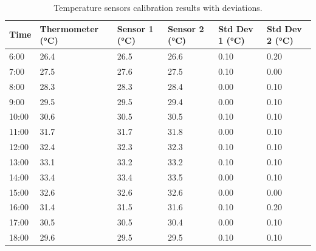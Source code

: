 \begin{table}[ht]
    \caption{Temperature sensors calibration results with deviations.}
    \label{tab:temperature-sensors-calibration}
    \hskip-1.2cm\begin{tabular}{@{}llllll@{}}
    \toprule
    \textbf{Time} & \textbf{Thermometer (°C)} & \textbf{Sensor 1 (°C)} & \textbf{Sensor 2 (°C)} & \textbf{Std Dev 1 (°C)} & \textbf{Std Dev 2 (°C)} \\ \midrule
    6:00          & 26.4                      & 26.5                   & 26.6                   & 0.10                    & 0.20                    \\
    7:00          & 27.5                      & 27.6                   & 27.5                   & 0.10                    & 0.00                    \\
    8:00          & 28.3                      & 28.3                   & 28.4                   & 0.00                    & 0.10                    \\
    9:00          & 29.5                      & 29.5                   & 29.4                   & 0.00                    & 0.10                    \\
    10:00         & 30.6                      & 30.5                   & 30.5                   & 0.10                    & 0.10                    \\
    11:00         & 31.7                      & 31.7                   & 31.8                   & 0.00                    & 0.10                    \\
    12:00         & 32.4                      & 32.3                   & 32.3                   & 0.10                    & 0.10                    \\
    13:00         & 33.1                      & 33.2                   & 33.2                   & 0.10                    & 0.10                    \\
    14:00         & 33.4                      & 33.4                   & 33.5                   & 0.00                    & 0.10                    \\
    15:00         & 32.6                      & 32.6                   & 32.6                   & 0.00                    & 0.00                    \\
    16:00         & 31.4                      & 31.5                   & 31.6                   & 0.10                    & 0.20                    \\
    17:00         & 30.5                      & 30.5                   & 30.4                   & 0.00                    & 0.10                    \\
    18:00         & 29.6                      & 29.5                   & 29.5                   & 0.10                    & 0.10                    \\ \bottomrule
    \end{tabular}
\end{table}

